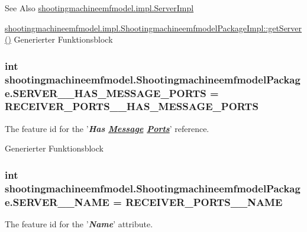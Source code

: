 \begin{DoxySeeAlso}{See Also}
\hyperlink{classshootingmachineemfmodel_1_1impl_1_1_server_impl}{shootingmachineemfmodel.\-impl.\-Server\-Impl} 

\hyperlink{classshootingmachineemfmodel_1_1impl_1_1_shootingmachineemfmodel_package_impl_acf844f025872ba16560467f31ef67236}{shootingmachineemfmodel.\-impl.\-Shootingmachineemfmodel\-Package\-Impl\-::get\-Server()} Generierter Funktionsblock 
\end{DoxySeeAlso}
\hypertarget{interfaceshootingmachineemfmodel_1_1_shootingmachineemfmodel_package_abce144db281b035c08fdb258b3890b5a}{
\subsubsection[{S\-E\-R\-V\-E\-R\-\_\-\-\_\-\-H\-A\-S\-\_\-\-M\-E\-S\-S\-A\-G\-E\-\_\-\-P\-O\-R\-T\-S}]{\setlength{\rightskip}{0pt plus 5cm}int shootingmachineemfmodel.\-Shootingmachineemfmodel\-Package.\-S\-E\-R\-V\-E\-R\-\_\-\-\_\-\-H\-A\-S\-\_\-\-M\-E\-S\-S\-A\-G\-E\-\_\-\-P\-O\-R\-T\-S = {\bf R\-E\-C\-E\-I\-V\-E\-R\-\_\-\-P\-O\-R\-T\-S\-\_\-\-\_\-\-H\-A\-S\-\_\-\-M\-E\-S\-S\-A\-G\-E\-\_\-\-P\-O\-R\-T\-S}}}\label{interfaceshootingmachineemfmodel_1_1_shootingmachineemfmodel_package_abce144db281b035c08fdb258b3890b5a}
The feature id for the '{\itshape {\bfseries Has \hyperlink{interfaceshootingmachineemfmodel_1_1_message}{Message} \hyperlink{interfaceshootingmachineemfmodel_1_1_ports}{Ports}}}' reference.

Generierter Funktionsblock  \hypertarget{interfaceshootingmachineemfmodel_1_1_shootingmachineemfmodel_package_a1b1bf6175595b723626d61b7e11d7fd6}{
\subsubsection[{S\-E\-R\-V\-E\-R\-\_\-\-\_\-\-N\-A\-M\-E}]{\setlength{\rightskip}{0pt plus 5cm}int shootingmachineemfmodel.\-Shootingmachineemfmodel\-Package.\-S\-E\-R\-V\-E\-R\-\_\-\-\_\-\-N\-A\-M\-E = {\bf R\-E\-C\-E\-I\-V\-E\-R\-\_\-\-P\-O\-R\-T\-S\-\_\-\-\_\-\-N\-A\-M\-E}}}\label{interfaceshootingmachineemfmodel_1_1_shootingmachineemfmodel_package_a1b1bf6175595b723626d61b7e11d7fd6}
The feature id for the '{\itshape {\bfseries Name}}' attribute.

